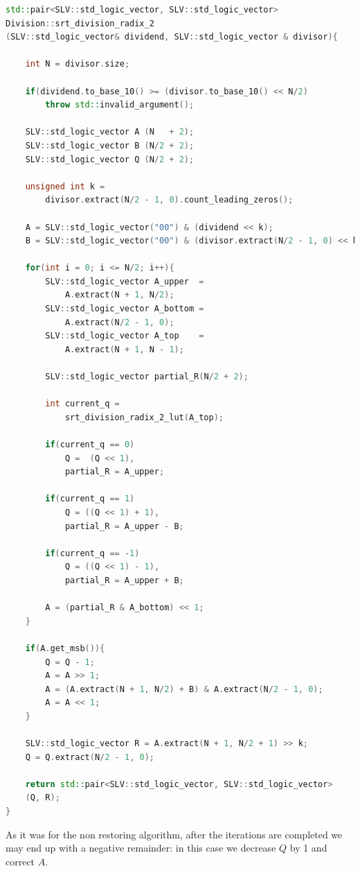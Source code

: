 \begin{lstlisting}[language=C++]
std::pair<SLV::std_logic_vector, SLV::std_logic_vector> 
Division::srt_division_radix_2
(SLV::std_logic_vector& dividend, SLV::std_logic_vector & divisor){
    
    int N = divisor.size;

    if(dividend.to_base_10() >= (divisor.to_base_10() << N/2)
        throw std::invalid_argument();
 
    SLV::std_logic_vector A (N   + 2);
    SLV::std_logic_vector B (N/2 + 2);
    SLV::std_logic_vector Q (N/2 + 2);

    unsigned int k = 
        divisor.extract(N/2 - 1, 0).count_leading_zeros();

    A = SLV::std_logic_vector("00") & (dividend << k);
    B = SLV::std_logic_vector("00") & (divisor.extract(N/2 - 1, 0) << k);
 
    for(int i = 0; i <= N/2; i++){
        SLV::std_logic_vector A_upper  = 
            A.extract(N + 1, N/2);
        SLV::std_logic_vector A_bottom = 
            A.extract(N/2 - 1, 0);
        SLV::std_logic_vector A_top    = 
            A.extract(N + 1, N - 1);

        SLV::std_logic_vector partial_R(N/2 + 2);

        int current_q =
            srt_division_radix_2_lut(A_top);

        if(current_q == 0)
            Q =  (Q << 1),
            partial_R = A_upper;

        if(current_q == 1)
            Q = ((Q << 1) + 1),
            partial_R = A_upper - B;

        if(current_q == -1)
            Q = ((Q << 1) - 1),
            partial_R = A_upper + B;
            
        A = (partial_R & A_bottom) << 1;
    }

    if(A.get_msb()){
        Q = Q - 1;
        A = A >> 1;
        A = (A.extract(N + 1, N/2) + B) & A.extract(N/2 - 1, 0);
        A = A << 1;
    }

    SLV::std_logic_vector R = A.extract(N + 1, N/2 + 1) >> k;
    Q = Q.extract(N/2 - 1, 0);

    return std::pair<SLV::std_logic_vector, SLV::std_logic_vector>
    (Q, R);
} 
\end{lstlisting}

As it was for the non restoring algorithm, after the iterations are completed we may end up with a negative remainder: in this case we decrease $Q$ by 1 and correct $A$. 

